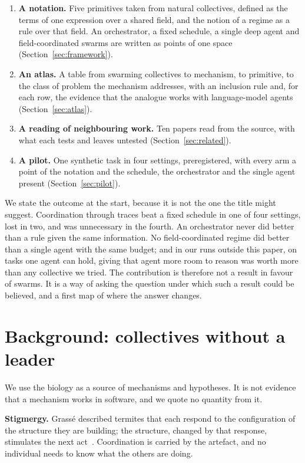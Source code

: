 \documentclass[10pt,twocolumn]{article}
\begin{document}
\begin{enumerate}\setlength{\itemsep}{0.1em}
\item \textbf{A notation.} Five primitives taken from natural collectives, defined as the terms of one expression over a shared field, and the notion of a regime as a rule over that field. An orchestrator, a fixed schedule, a single deep agent and field-coordinated swarms are written as points of one space (Section~\ref{sec:framework}).
\item \textbf{An atlas.} A table from swarming collectives to mechanism, to primitive, to the class of problem the mechanism addresses, with an inclusion rule and, for each row, the evidence that the analogue works with language-model agents (Section~\ref{sec:atlas}).
\item \textbf{A reading of neighbouring work.} Ten papers read from the source, with what each tests and leaves untested (Section~\ref{sec:related}).
\item \textbf{A pilot.} One synthetic task in four settings, preregistered, with every arm a point of the notation and the schedule, the orchestrator and the single agent present (Section~\ref{sec:pilot}).
\end{enumerate}

We state the outcome at the start, because it is not the one the title might suggest. Coordination through traces beat a fixed schedule in one of four settings, lost in two, and was unnecessary in the fourth. An orchestrator never did better than a rule given the same information. No field-coordinated regime did better than a single agent with the same budget; and in our runs outside this paper, on tasks one agent can hold, giving that agent more room to reason was worth more than any collective we tried. The contribution is therefore not a result in favour of swarms. It is a way of asking the question under which such a result could be believed, and a first map of where the answer changes.

\section{Background: collectives without a leader}

We use the biology as a source of mechanisms and hypotheses. It is not evidence that a mechanism works in software, and we quote no quantity from it.

\textbf{Stigmergy.} Grass\'e described termites that each respond to the configuration of the structure they are building; the structure, changed by that response, stimulates the next act~\cite{grasse1959,theraulaz1999}. Coordination is carried by the artefact, and no individual needs to know what the others are doing.
\end{document}
